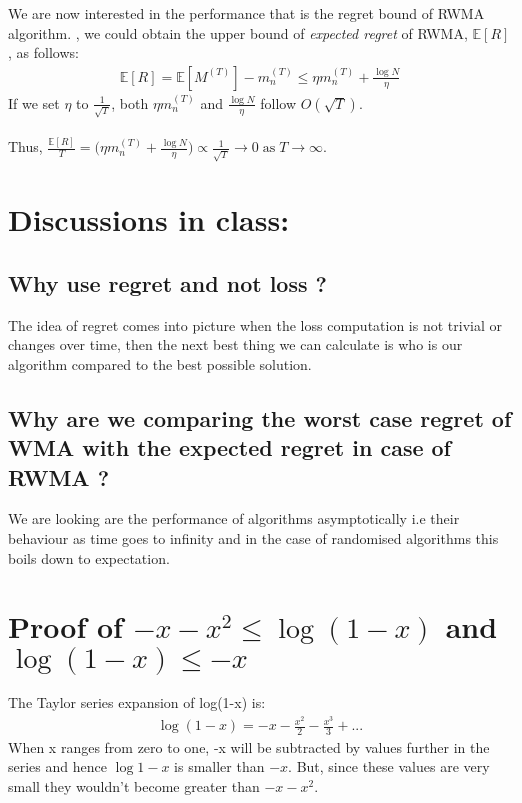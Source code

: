\documentclass[11pt]{article}
\begin{document}
We are now interested in the performance that is the regret bound of RWMA algorithm.
, we could obtain the upper bound of \textit{expected regret} of RWMA, $\mathbb{E}[R]$, as follows:
\begin{align}
    \mathbb{E}[R] = \mathbb{E}[M^{(T)}] - m_n^{(T)} \leq \eta m_n^{(T)} + \frac{\log N}{\eta} \label{eq:rwma_final}
\end{align}
If we set $\eta$ to $\frac{1}{\sqrt{T}}$, both $\eta m_n^{(T)}$ and $\frac{\log N}{\eta}$ follow $O(\sqrt{T})$.\\\\
Thus, $\frac{\mathbb{E}[R]}{T} = \Big(\eta m_n^{(T)} + \frac{\log N}{\eta}\Big) \propto \frac{1}{\sqrt{T}}\rightarrow 0\;\text{as}\;T\rightarrow\infty$.

\section{Discussions in class:}
\subsection{Why use regret and not loss ?}
The idea of regret comes into picture when the loss computation is not trivial or changes over time, then the next best thing we can calculate is who is our algorithm compared to the best possible solution.
\subsection{Why are we comparing the worst case regret of WMA with the expected regret in case of RWMA ?}
We are looking are the performance of algorithms asymptotically i.e their behaviour as time goes to infinity and in the case of randomised algorithms this boils down to expectation.


{


}




\appendix

\section{Proof of $-x-x^2\leq\log(1-x)\label{eq:ineq2}$ and
    $\log(1-x)\leq-x\label{eq:ineq1}$}
The Taylor series expansion of log(1-x) is:
\begin{align}
    \log(1-x)=-x-\frac{x^2}{2}-\frac{x^3}{3}+...
\end{align}
When x ranges from zero to one, -x will be subtracted by values further in the series and hence $\log{1-x}$ is smaller than $-x.$ But, since these values are very small they wouldn't become greater than $-x-x^{2}$.  
\end{document}
